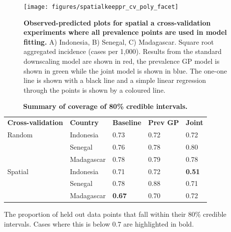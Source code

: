 \documentclass[10pt,letterpaper]{article}
\newlength\savedwidth
\newcommand\thickhline{\noalign{\global\savedwidth\arrayrulewidth\global\arrayrulewidth 2pt}%
\hline
\noalign{\global\arrayrulewidth\savedwidth}}
\begin{document}


\begin{figure}
\texttt{[image: figures/spatialkeeppr\_cv\_poly\_facet]}  
\caption{{\bf Observed-predicted plots for spatial a cross-validation experiments where all prevalence points are used in model fitting.}
A) Indonesia, B) Senegal, C) Madagascar. Square root aggregated incidence (cases per 1,000).
Results from the standard downscaling model are shown in red, the prevalence GP model is shown in green while the joint model is shown in blue.
The one-one line is shown with a black line and a simple linear regression through the points is shown by a coloured line.
}
\label{spatial2predobspolyfacet}
\end{figure}



\begin{table}[t]
\begin{adjustwidth}{-2.25in}{0in} %
\centering
\caption{
{\bf Summary of coverage of 80\% credible intervals.}}
\begin{tabular}{lllll}
\hline
{\bf Cross-validation} & {\bf Country}  & {\bf Baseline} & {\bf Prev GP} & {\bf Joint} \\
\thickhline 
Random & Indonesia  & 0.73 &  0.72 &  0.72\\
& Senegal  & 0.76 &  0.78 &  0.80\\
& Madagascar  & 0.78 &  0.79 &  0.78\vspace{1mm}\\
 Spatial  & Indonesia & 0.71 &  0.72 &  {\bf 0.51}\\
& Senegal  & 0.78 &  0.88 &  0.71\\
& Madagascar  & {\bf 0.67} &  0.70 &  0.72\\


\end{tabular}
\begin{flushleft}
The proportion of held out data points that fall within their 80\% credible intervals. 
Cases where this is below 0.7 are highlighted in bold.
\end{flushleft}
\label{table3}
\end{adjustwidth}
\end{table}




\end{document}
